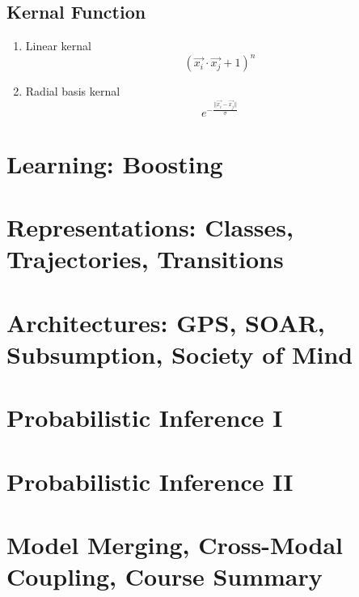 \documentclass[12pt]{book}
\begin{document}
\subsection{Kernal Function}
\begin{enumerate}
	\item Linear kernal
	$$(\vec{x_i}\cdot\vec{x_j}+1)^n$$
	\item Radial basis kernal 
	$$e^{-\frac{||\vec{x_i}-\vec{x_j}||}{\sigma}}$$
\end{enumerate}
\section{Learning: Boosting}

\newpage
\section{Representations: Classes, Trajectories, Transitions}

\newpage
\section{Architectures: GPS, SOAR, Subsumption, Society of Mind}

\newpage
\section{Probabilistic Inference I}

\newpage
\section{Probabilistic Inference II}

\newpage
\section{Model Merging, Cross-Modal Coupling, Course Summary}
\end{document}
